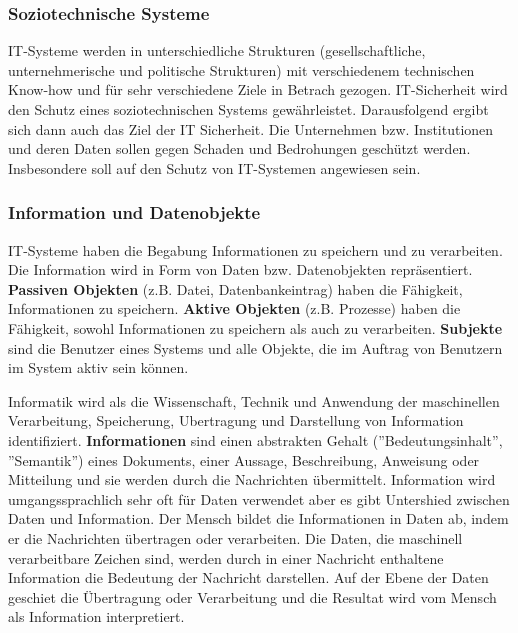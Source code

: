 \subsubsection{Soziotechnische Systeme}

IT-Systeme werden in unterschiedliche Strukturen (gesellschaftliche, unternehmerische und politische Strukturen) mit verschiedenem technischen Know-how und für sehr verschiedene Ziele in Betrach gezogen\cite[23]{eckert2013sicherheit}. IT-Sicherheit wird den Schutz eines soziotechnischen Systems gewährleistet. Darausfolgend ergibt sich dann auch das Ziel der IT Sicherheit. Die Unternehmen bzw. Institutionen und deren Daten sollen gegen Schaden und Bedrohungen geschützt werden. Insbesondere soll auf den Schutz von IT-Systemen angewiesen sein\cite{so18tech}. 
\subsubsection{Information und Datenobjekte}

IT-Systeme haben die Begabung Informationen zu speichern und zu verarbeiten. Die Information wird in Form von Daten bzw. Datenobjekten repräsentiert. \textbf{Passiven Objekten} (z.B. Datei, Datenbankeintrag) haben die Fähigkeit, Informationen zu speichern. \textbf{Aktive Objekten} (z.B. Prozesse) haben die Fähigkeit, sowohl Informationen zu speichern als auch zu verarbeiten\cite[23]{eckert2013sicherheit}. \textbf{Subjekte} sind die Benutzer eines Systems und alle Objekte, die im Auftrag von Benutzern im System aktiv sein können\cite[24]{eckert2013sicherheit}. 

Informatik wird als die Wissenschaft, Technik und Anwendung der maschinellen Verarbeitung, Speicherung, Ubertragung und Darstellung von Information identifiziert. \textbf{Informationen} sind einen abstrakten Gehalt (''Bedeutungsinhalt'', ''Semantik'') eines Dokuments, einer Aussage, Beschreibung, Anweisung oder Mitteilung\cite[5]{broy2013informatik} und sie werden durch die Nachrichten übermittelt\cite[18]{blieberger2013informatik}. Information wird umgangssprachlich sehr oft für Daten verwendet aber es gibt Untershied zwischen Daten und Information. Der Mensch bildet die Informationen in Daten ab, indem er die Nachrichten übertragen oder verarbeiten. Die Daten, die maschinell verarbeitbare Zeichen sind, werden durch in einer Nachricht enthaltene Information die Bedeutung der Nachricht darstellen. Auf der Ebene der Daten geschiet die Übertragung oder Verarbeitung und die Resultat wird vom Mensch als Information interpretiert\cite{infstd}.

